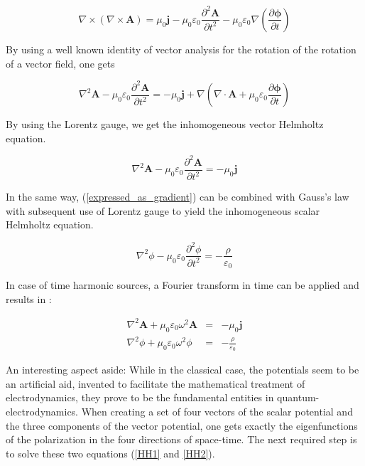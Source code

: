 \documentclass[a4paper,14pt]{extbook}
\begin{document}
\begin{equation}
\nabla \times ( \nabla \times \mathbf{A} ) =\mu_0 \mathbf{j}-\mu_0 \varepsilon_0 \frac{\partial^2 \mathbf{A}}{\partial t^2}- \mu_0 \varepsilon_0 \nabla \left( \frac{\partial \mathbf{\phi}}{\partial t} \right)
\end{equation}

By using a well known identity of vector analysis for the rotation of the rotation of a vector field, one gets

\begin{equation}
\nabla^2 \mathbf{A} - \mu_0 \varepsilon_0 \frac{\partial^2 \mathbf{A}}{\partial t^2} =-\mu_0 \mathbf{j}+\nabla \left( \nabla \cdot \mathbf{A} + \mu_0 \varepsilon_0 \frac{\partial \mathbf{\phi}}{\partial t} \right)
\end{equation}

By using the Lorentz gauge, we get the inhomogeneous vector Helmholtz equation.

\begin{equation}
\nabla^2 \mathbf{A} - \mu_0 \varepsilon_0 \frac{\partial^2 \mathbf{A}}{\partial t^2} =-\mu_0 \mathbf{j}
\end{equation}

In the same way, (\ref{expressed_as_gradient}) can be combined with Gauss's law with subsequent use of Lorentz gauge to yield the inhomogeneous scalar Helmholtz equation.

\begin{equation}
\nabla^2 \phi - \mu_0 \varepsilon_0 \frac{\partial^2 \phi }{\partial t^2} =-\frac{\rho }{\varepsilon_0 }
\end{equation}

In case of time harmonic sources, a Fourier transform in time can be applied and results in :

\begin{eqnarray}
\nabla^2 \mathbf{A} + \mu_0 \varepsilon_0 \omega^2 \mathbf{A}&=& -\mu_0 \mathbf{j} \label{HH1}\\
\nabla^2 \phi + \mu_0 \varepsilon_0 \omega^2 \phi  &=&-\frac{\rho }{\varepsilon_0 } \label{HH2}
\end{eqnarray}

An interesting aspect aside: While in the classical case, the potentials seem to be an artificial aid, invented to facilitate the mathematical treatment of electrodynamics, they prove to be the fundamental entities in quantum-electrodynamics. When creating a set of four vectors of the scalar potential and the three components of the vector potential, one gets exactly the eigenfunctions of the polarization in the four directions of space-time. The next required step is to solve these two equations (\ref{HH1} and \ref{HH2}).\\
\end{document}
